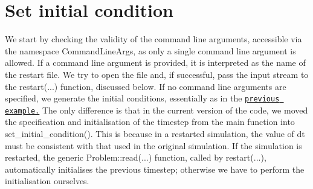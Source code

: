  

\hypertarget{index_IC}{}\section{Set initial condition}\label{index_IC}
We start by checking the validity of the command line arguments, accessible via the namespace {\ttfamily Command\+Line\+Args}, as only a single command line argument is allowed. If a command line argument is provided, it is interpreted as the name of the restart file. We try to open the file and, if successful, pass the input stream to the {\ttfamily restart}(...) function, discussed below. If no command line arguments are specified, we generate the initial conditions, essentially as in the \href{../../two_d_unsteady_heat/html/index.html}{\tt previous example.} The only difference is that in the current version of the code, we moved the specification and initialisation of the timestep from the {\ttfamily main} function into {\ttfamily set\+\_\+initial\+\_\+condition()}. This is because in a restarted simulation, the value of {\ttfamily dt} must be consistent with that used in the original simulation. If the simulation is restarted, the generic {\ttfamily Problem\+::read}(...) function, called by {\ttfamily restart}(...), automatically initialises the previous timestep; otherwise we have to perform the initialisation ourselves.


